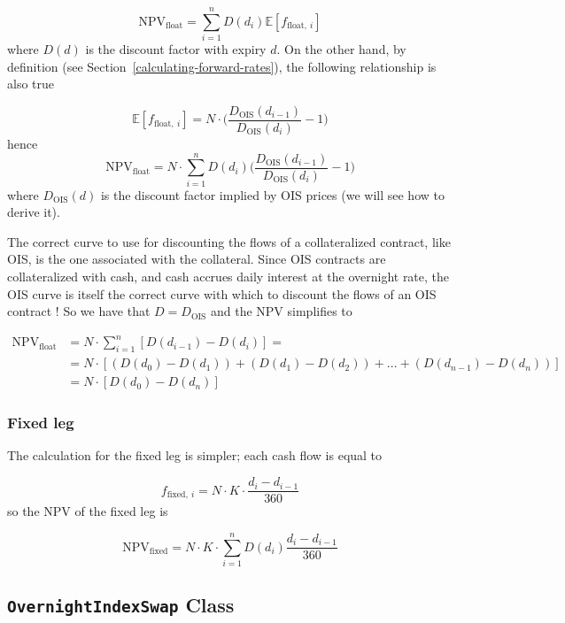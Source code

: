\[\mathrm{NPV}_{\mathrm{float}} = \sum_{i=1}^{n}D(d_i)\mathbb{E}[f_{\mathrm{float},~i}]\]
where \(D(d)\) is the discount factor with expiry \(d\). On the other
hand, by definition (see Section~\ref{calculating-forward-rates}), the following relationship is also true

\[\mathbb{E}[f_{\mathrm{float},~i}] = N\cdot\Big(\frac{D_{\mathrm{OIS}}(d_{i-1})}{D_{\mathrm{OIS}}(d_{i})} - 1\Big)\]
hence
\[\mathrm{NPV}_{\mathrm{float}} = N\cdot \sum_{i=1}^{n}D(d_i) \Big(\frac{D_{\mathrm{OIS}}(d_{i-1})}{D_{\mathrm{OIS}}(d_{i})} - 1\Big)\]
where \(D_{\mathrm{OIS}}(d)\) is the discount factor implied by OIS
prices (we will see how to derive it).

The correct curve to use for discounting the flows of a collateralized contract, like OIS, is the one associated with the collateral. Since OIS contracts are collateralized with cash, and cash accrues daily interest at the overnight rate, the OIS curve is itself the correct curve with which to discount the flows of an OIS contract ! So we have that \(D = D_{\mathrm{OIS}}\) and the NPV simplifies to

\begin{equation}
  \begin{split}
    \mathrm{NPV}_{\mathrm{float}} & = N\cdot\sum_{i=1}^{n}[D(d_{i-1}) - D(d_i)] =  \\
    &= N\cdot[(D(d_{0}) - D(d_{1})) + (D(d_{1}) - D(d_{2})) + ... + (D(d_{n-1}) - D(d_{n}))]\\
    &= N \cdot [D(d_0) - D(d_n)]
  \end{split}
\end{equation}

\subsubsection{Fixed leg}\label{fixed-leg}

The calculation for the fixed leg is simpler; each cash flow is equal to

\[f_{\mathrm{fixed},~i}=N\cdot K\cdot \frac{d_i - d_{i-1}}{360}\] so the
NPV of the fixed leg is

\[\mathrm{NPV}_{\mathrm{fixed}} = N\cdot K\cdot \sum_{i=1}^{n}D(d_{i})\frac{d_i - d_{i-1}}{360}\]


\subsection{\texttt{OvernightIndexSwap} Class}\label{discount-factor-determination-from-market-quotes}

